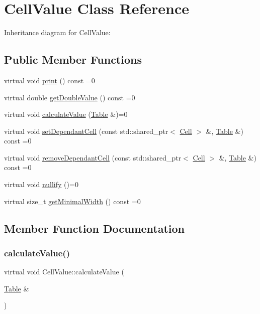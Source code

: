 \hypertarget{classCellValue}{}\section{Cell\+Value Class Reference}
\label{classCellValue}


Inheritance diagram for Cell\+Value\+:
\subsection*{Public Member Functions}
\begin{DoxyCompactItemize}
\item 
virtual void \hyperlink{classCellValue_a12d1cf68a5ba83f0c375441729772742}{print} () const =0
\item 
virtual double \hyperlink{classCellValue_a3d2850b3a8473050fd46f486a29ed5bf}{get\+Double\+Value} () const =0
\item 
virtual void \hyperlink{classCellValue_ab644256decf3608ed50e389ead6cf611}{calculate\+Value} (\hyperlink{classTable}{Table} \&)=0
\item 
virtual void \hyperlink{classCellValue_ad2437fb3d4d4a96d9a76c857b3d04231}{set\+Dependant\+Cell} (const std\+::shared\+\_\+ptr$<$ \hyperlink{classCell}{Cell} $>$ \&, \hyperlink{classTable}{Table} \&) const =0
\item 
virtual void \hyperlink{classCellValue_a72b4390db6c53e525550cefade66fb0e}{remove\+Dependant\+Cell} (const std\+::shared\+\_\+ptr$<$ \hyperlink{classCell}{Cell} $>$ \&, \hyperlink{classTable}{Table} \&) const =0
\item 
virtual void \hyperlink{classCellValue_af4f30a4b36e159f2f2bfc7ed83f1b37a}{nullify} ()=0
\item 
virtual size\+\_\+t \hyperlink{classCellValue_ad96473ba3dd88b83da96c03ae31a2ede}{get\+Minimal\+Width} () const =0
\end{DoxyCompactItemize}


\subsection{Member Function Documentation}
\mbox{\label{classCellValue_ab644256decf3608ed50e389ead6cf611}} 
\subsubsection{\texorpdfstring{calculate\+Value()}{calculateValue()}}
{\footnotesize\ttfamily virtual void Cell\+Value\+::calculate\+Value (\begin{DoxyParamCaption}\item[{\hyperlink{classTable}{Table} \&}]{ }\end{DoxyParamCaption})\hspace{0.3cm}{\ttfamily [pure virtual]}}


